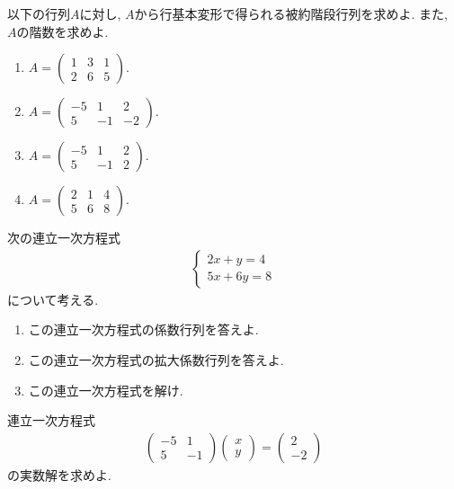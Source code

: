 \begin{quiz}
  \label{quiz:3:1}

  以下の行列$A$に対し,
   $A$から行基本変形で得られる被約階段行列を求めよ.
  また, $A$の階数を求めよ.
  \begin{enumerate}
    \item
      $A=\begin{pmatrix}1&3&1\\2&6&5\end{pmatrix}$.
    \item
      $A=\begin{pmatrix}-5&1&2\\5&-1&-2\end{pmatrix}$.
    \item
      $A=\begin{pmatrix}-5&1&2\\5&-1&2\end{pmatrix}$.
    \item
      $A=\begin{pmatrix}2&1&4\\5&6&8\end{pmatrix}$.
  \end{enumerate}
\end{quiz}

\begin{quiz}
  \label{quiz:3:2}
  次の連立一次方程式
  \begin{align*}
    \begin{cases}
      2x+y=4\\
      5x+6y=8
      \end{cases}
  \end{align*}
  について考える.
  \begin{enumerate}
    \item この連立一次方程式の係数行列を答えよ.
    \item この連立一次方程式の拡大係数行列を答えよ.
    \item この連立一次方程式を解け.
  \end{enumerate}
\end{quiz}

\begin{quiz}
  \label{quiz:3:3}
  連立一次方程式
  \begin{align*}
    \begin{pmatrix}-5&1\\5&-1\end{pmatrix}
    \begin{pmatrix}x\\y\end{pmatrix}
      =
      \begin{pmatrix}2\\-2\end{pmatrix}
  \end{align*}
  の実数解を求めよ.
\end{quiz}


